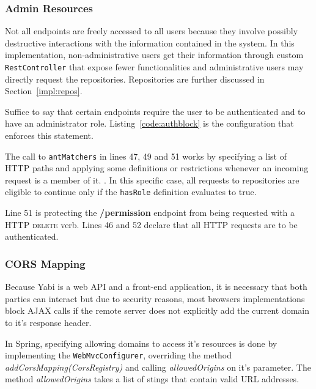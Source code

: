 \subsubsection{Admin Resources}\label{impl:admres}
Not all endpoints are freely accessed to all users because they involve possibly destructive interactions with the information contained in the system. In this implementation, non-administrative users get their information through custom \texttt{RestController} that expose fewer functionalities and administrative users may directly request the repositories. Repositories are further discussed in Section~\ref{impl:repos}.

Suffice to say that certain endpoints require the user to be authenticated and to have an administrator role. Listing~\ref{code:authblock} is the configuration that enforces this statement.

The call to \texttt{antMatchers} in lines 47, 49 and 51 works by specifying a list of \gls{HTTP} paths and applying some definitions or restrictions whenever an incoming request is a member of it. . In this specific case, all requests to repositories are eligible to continue only if the \texttt{hasRole} definition evaluates to true.

Line 51 is protecting the \textbf{/permission} endpoint from being requested with a \gls{HTTP} \textsc{delete} verb.
Lines 46 and 52 declare that all \gls{HTTP} requests are to be authenticated.



\subsubsection{\gls{CORS} Mapping}

Because \gls{Yabi} is a web \gls{API} and a front-end application, it is necessary that both parties can interact but due to security reasons, most browsers implementations block \gls{AJAX} calls if the remote server does not explicitly add the current domain to it's response header.

In Spring, specifying allowing domains to access it's resources is done by implementing the \texttt{WebMvcConfigurer}, overriding the method \textit{addCorsMapping(CorsRegistry)} and calling \textit{allowedOrigins} on it's parameter. The method \textit{allowedOrigins} takes a list of stings that contain valid \gls{URL} addresses.

